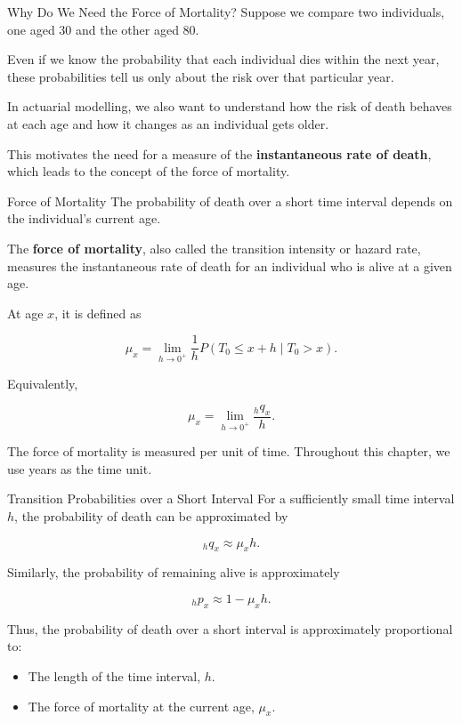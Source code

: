 \documentclass[
  ignorenonframetext,
  aspectratio=169,
]{beamer}
\providecommand{\tightlist}{%
  \setlength{\itemsep}{0pt}\setlength{\parskip}{0pt}}
\begin{document}
\begin{frame}{Why Do We Need the Force of Mortality?}
\protect{}\label{why-do-we-need-the-force-of-mortality}
Suppose we compare two individuals, one aged 30 and the other aged 80.

Even if we know the probability that each individual dies within the
next year, these probabilities tell us only about the risk over that
particular year.

In actuarial modelling, we also want to understand how the risk of death
behaves at each age and how it changes as an individual gets older.

This motivates the need for a measure of the \textbf{instantaneous rate
of death}, which leads to the concept of the force of mortality.
\end{frame}

\begin{frame}{Force of Mortality}
\protect{}\label{force-of-mortality}
The probability of death over a short time interval depends on the
individual's current age.

The \textbf{force of mortality}, also called the transition intensity or
hazard rate, measures the instantaneous rate of death for an individual
who is alive at a given age.

At age \(x\), it is defined as

\[
\mu_x
=
\lim_{h\to 0^+}
\frac{1}{h}
P(T_0\leq x+h\mid T_0>x).
\]

Equivalently,

\[
\mu_x
=
\lim_{h\to 0^+}\frac{{}_hq_x}{h}.
\]

The force of mortality is measured per unit of time. Throughout this
chapter, we use years as the time unit.
\end{frame}

\begin{frame}{Transition Probabilities over a Short Interval}
\protect{}\label{transition-probabilities-over-a-short-interval}
For a sufficiently small time interval \(h\), the probability of death
can be approximated by

\[
{}_hq_x\approx \mu_x h.
\]

Similarly, the probability of remaining alive is approximately

\[
{}_hp_x\approx 1-\mu_xh.
\]

Thus, the probability of death over a short interval is approximately
proportional to:

\begin{itemize}
\tightlist
\item
  The length of the time interval, \(h\).
\item
  The force of mortality at the current age, \(\mu_x\).
\end{itemize}
\end{frame}
\end{document}
